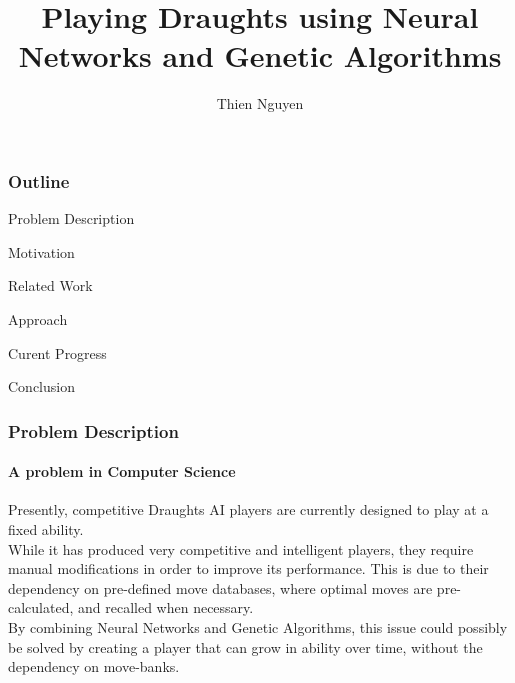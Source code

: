 \documentclass{beamer}
\title[NN and GA To Play Draughts] %
	{Playing Draughts using Neural Networks and Genetic Algorithms}
\author[T. Nguyen] %
	{Thien Nguyen}
\institute[Durham] %
	{
	Department of Computer Science\\
	Durham University
	}
\begin{document}
\frame{\titlepage}

\begin{frame}

  \frametitle{Outline}
	\begin{block}{Problem Description}
	 \end{block}
	\begin{block}{Motivation}
	\end{block}
	\begin{block}{Related Work}
	\end{block}
	\begin{block}{Approach}
	\end{block}
	\begin{block}{Curent Progress}
	\end{block}
	\begin{block}{Conclusion}
	\end{block}
	  
  
\end{frame}

\begin{frame}
  \frametitle{Problem Description}
  \framesubtitle{A problem in Computer Science}
	Presently, competitive Draughts AI players are currently designed to play at a fixed ability. \\
	While it has produced very competitive and intelligent players, they require manual modifications in order to improve its performance. This is due to their dependency on pre-defined move databases, where optimal moves are pre-calculated, and recalled when necessary. \\
	By combining Neural Networks and Genetic Algorithms, this issue could possibly be solved by creating a player that can grow in ability over time, without the dependency on move-banks.


\end{frame}
\end{document}
